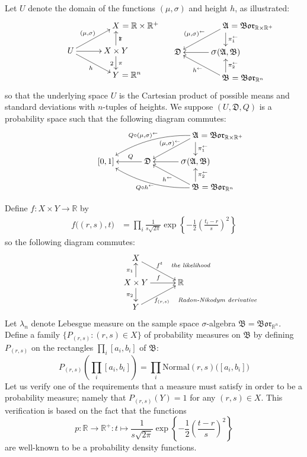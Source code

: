 \documentclass[
twoside=true,
paper=letter,
fontsize=9pt,
pagesize=auto,
leqno,
openany,
headsepline,
overfullrule,
]{scrbook}
\theoremstyle{plain}
\theoremstyle{plain}
\theoremstyle{definition}
\theoremstyle{bfnoteitalic}
\theoremstyle{bfnoteroman}
\newcommand{\sigalg}[1]{\mathfrak{#1}}
\newcommand{\borel}{\mathfrak{Bor}}
\newcommand{\sagb}{\mathop{\hbox{\large{$\sigma$}}}\nolimits}
\newcommand{\textsigma}{\hbox{\large{$\sigma$}}\kern-1pt}
\newcommand{\preimage}[1]{#1^{\leftarrow}}
\newcommand{\R}{\mathbb{R}}
\newcommand{\productsig}[2]{\sagb(#1,#2)}
\newcommand{\function}{f}
\newcommand{\measurespace}{X}
\newcommand{\measurespaceii}{Y}
\newcommand{\measureiii}{\lambda}
\newcommand{\projectionone}{\pi_1}
\newcommand{\projectiontwo}{\pi_2}
\newcommand{\pspace}{\measurespace}%
\newcommand{\sspace}{\measurespaceii}%
\newcommand{\sspacesig}{\sigalg{B}}
\newcommand{\pspacesig}{\sigalg{A}}
\begin{document}
Let $U$ denote the domain of the functions $(\mu,\sigma)$ and height $h$, as illustrated:
\[
\xymatrix@R=16pt@C=30pt{ 
 & \pspace \rlap{ $=\R\times\R^+$}
 \\
 U \ar[ur]^{(\mu,\sigma)} \ar[dr]_h \ar[r] & 
 \pspace\times\sspace \ar[u]_\projectionone \ar[d]^\projectiontwo
 \\
  & \sspace\rlap{ $=\R^n$} \\
}
%
\hspace{50pt}
%
\xymatrix@R=16pt@C=30pt{ 
 & \pspacesig \rlap{ $=\borel_{\R\times\R^+}$}
 \ar[dl]_{\preimage{(\mu,\sigma)}} 
 \ar[d]^{\preimage{\projectionone}}
 \\
 \sigalg{D}  & 
 \productsig{\pspacesig}{\sspacesig} 
 \ar[l]  
 \\
  & \sspacesig \rlap{ $=\borel_{\R^n}$}
  \ar[u]_{\preimage{\projectiontwo}}
  \ar[ul]^{\preimage{h}}
  \\
}
\]
so that the underlying space  $U$ is the Cartesian product of possible means and standard deviations with $n$-tuples of heights.
We suppose $(U,\sigalg{D},Q)$ is a probability space such that the following diagram commutes:
\[
\xymatrix@R=16pt@C=30pt{ 
 & & \pspacesig \rlap{ $=\borel_{\R\times\R^+}$}
 \ar[dl]_{\kern30pt\preimage{(\mu,\sigma)}} 
 \ar[d]^{\preimage{\projectionone}}
 \ar@/_10pt/[lld]_{Q\circ \preimage{(\mu,\sigma)}}
 \\
 [0,1] & \sigalg{D} \ar[l]_-{\ Q} & 
 \productsig{\pspacesig}{\sspacesig} 
 \ar[l]  
 \\
 & & \sspacesig \rlap{ $=\borel_{\R^n}$}
  \ar[u]_{\preimage{\projectiontwo}}
  \ar[ul]^{\preimage{h}}
  \ar@/^10pt/[llu]^{Q\circ\preimage{h}}
  \\
}
\]

Define $\function:\pspace \times \sspace \to\R$ by
\begin{align*}
\function\bigl((r,s),t\bigr)
& =
\prod_i
\frac{1}{s\sqrt{2\pi}}
\exp
\left\{
-\frac{1}{2}
\left(
\frac{t_i-r}{s}
\right)^2
\right\}
\end{align*}
so the following diagram commutes:
\[
\xymatrix@R=16pt@C=30pt{ 
\pspace \ar[dr]^{\function^t\quad \rlap{\emph{\scriptsize the likelihood}}}
& \\
\pspace\times\sspace 
\ar[u]^{\projectionone}
\ar[d]_{\projectiontwo}
\ar[r]^{\function}
& \R \\
\sspace 
\ar[ur]_{\function_{(r,s)} \quad \rlap{\emph{\scriptsize Radon-Nikodym derivative}}} 
& 
}
\]
Let $\measureiii_n$ denote Lebesgue measure on the sample space \textsigma-algebra 
$\sspacesig=\borel_{\R^n}$.
Define a family $\{P_{(r,s)} : (r,s) \in \pspace \}$ of probability measures on $\sspacesig$ by defining
$P_{(r,s)}$ on the
rectangles $\prod_i[a_i,b_i]$ of $\sspacesig$:
\[
P_{(r,s)}\left(\prod_i[a_i,b_i]\right) =
\prod_i\text{Normal}(r,s)\bigl([a_i,b_i]\bigr)
\]
Let us verify one of the requirements that a measure must satisfy in order to be a probability measure; namely that
$P_{(r,s)}(\sspace)=1$ for any $(r,s)\in\pspace$.
This verification is based on the fact that the functions
\[
p:\R\to\R^+
:t \mapsto
\frac{1}{s\sqrt{2\pi}}
\exp
\left\{
-\frac{1}{2}
\left(
\frac{t-r}{s}
\right)^2
\right\}
\]
are well-known to be a probability density functions.
\end{document}
